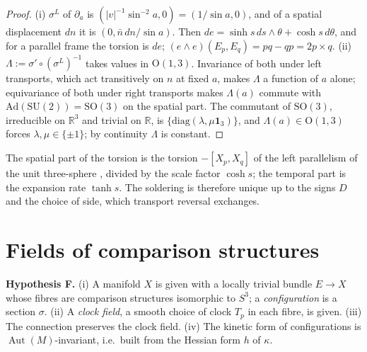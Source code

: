 \documentclass[aps,pra,onecolumn,superscriptaddress,nofootinbib,10pt]{revtex4-2}
\theoremstyle{definition}
\theoremstyle{remark}
\newcommand{\R}{\mathbb{R}}
\newcommand{\Aut}{\operatorname{Aut}}
\newcommand{\SU}{\mathrm{SU}}
\newcommand{\SO}{\mathrm{SO}}
\newcommand{\OO}{\mathrm{O}}
\begin{document}
\begin{proof}
(i) $\sigma^L$ of $\partial_a$ is $(\lvert v\rvert^{-1}\sin^{-2}a,0)=(1/\sin a,0)$, and of a spatial displacement
$dn$ it is $(0,\bar n\,dn/\sin a)$.  Then $de=\sinh s\,ds\wedge\theta+\cosh s\,d\theta$, and for a parallel frame
the torsion is $de$; $(e\wedge e)(E_p,E_q)=pq-qp=2p\times q$.
(ii) $\Lambda:=\sigma'\circ(\sigma^L)^{-1}$ takes values in $\OO(1,3)$.  Invariance of both under left
transports, which act transitively on $n$ at fixed $a$, makes $\Lambda$ a function of $a$ alone; equivariance
of both under right transports makes $\Lambda(a)$ commute with $\mathrm{Ad}(\SU(2))=\SO(3)$ on the spatial part.
The commutant of $\SO(3)$, irreducible on $\R^3$ and trivial on $\R$, is $\{\mathrm{diag}(\lambda,\mu\mathbf1_3)\}$,
and $\Lambda(a)\in\OO(1,3)$ forces $\lambda,\mu\in\{\pm1\}$; by continuity $\Lambda$ is constant.
\end{proof}
The spatial part of the torsion is the torsion $-[X_p,X_q]$ of the left parallelism of the unit
three-sphere \cite[Prop.~5.3(i)]{PaperI}, divided by the scale factor $\cosh s$; the temporal part is the expansion rate
$\tanh s$.  The soldering is therefore unique up to the signs $D$ and the choice of side, which
transport reversal exchanges.

\section{Fields of comparison structures}\label{sec:fields}

\smallskip\noindent\textbf{Hypothesis F.}\label{hyp:F}  (i) A manifold $X$ is given with a locally trivial bundle
$E\to X$ whose fibres are comparison structures isomorphic to $S^3$; a \emph{configuration} is a section
$\sigma$.  (ii) A \emph{clock field}, a smooth choice of clock $T_p$ in each fibre, is given.  (iii) The
connection preserves the clock field.  (iv) The kinetic form of configurations is
$\Aut(M)$-invariant, i.e.\ built from the Hessian form $h$ of $\kappa$.
\end{document}
